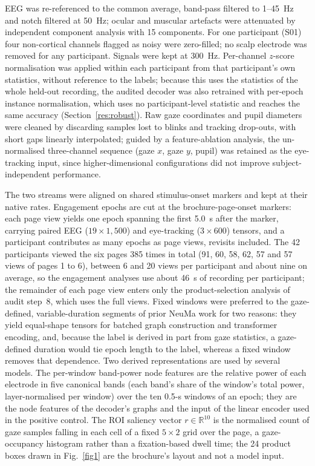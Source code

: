 \documentclass[pdflatex,sn-basic,Numbered,twocolumn,iicol]{sn-jnl}
\theoremstyle{thmstyleone}%
\theoremstyle{thmstyletwo}%
\theoremstyle{thmstylethree}%
\begin{document}
EEG was re-referenced to the common average, band-pass filtered to 1--45~Hz and notch filtered at 50~Hz; ocular and muscular artefacts were attenuated by independent component analysis with 15 components. For one participant (S01) four non-cortical channels flagged as noisy were zero-filled; no scalp electrode was removed for any participant. Signals were kept at 300~Hz. Per-channel $z$-score normalisation was applied within each participant from that participant's own statistics, without reference to the labels; because this uses the statistics of the whole held-out recording, the audited decoder was also retrained with per-epoch instance normalisation, which uses no participant-level statistic and reaches the same accuracy (Section~\ref{res:robust}). Raw gaze coordinates and pupil diameters were cleaned by discarding samples lost to blinks and tracking drop-outs, with short gaps linearly interpolated; guided by a feature-ablation analysis, the un-normalised three-channel sequence (gaze $x$, gaze $y$, pupil) was retained as the eye-tracking input, since higher-dimensional configurations did not improve subject-independent performance.

The two streams were aligned on shared stimulus-onset markers and kept at their native rates. Engagement epochs are cut at the brochure-page-onset markers: each page view yields one epoch spanning the first 5.0~s after the marker, carrying paired EEG ($19\times1{,}500$) and eye-tracking ($3\times600$) tensors, and a participant contributes as many epochs as page views, revisits included. The 42 participants viewed the six pages 385 times in total (91, 60, 58, 62, 57 and 57 views of pages 1 to 6), between 6 and 20 views per participant and about nine on average, so the engagement analyses use about 46~s of recording per participant; the remainder of each page view enters only the product-selection analysis of audit step~8, which uses the full views. Fixed windows were preferred to the gaze-defined, variable-duration segments of prior NeuMa work \cite{ref18} for two reasons: they yield equal-shape tensors for batched graph construction and transformer encoding, and, because the label is derived in part from gaze statistics, a gaze-defined duration would tie epoch length to the label, whereas a fixed window removes that dependence. Two derived representations are used by several models. The per-window band-power node features are the relative power of each electrode in five canonical bands (each band's share of the window's total power, layer-normalised per window) over the ten 0.5-s windows of an epoch; they are the node features of the decoder's graphs and the input of the linear encoder used in the positive control. The ROI saliency vector $r\in\mathbb{R}^{10}$ is the normalised count of gaze samples falling in each cell of a fixed $5\times2$ grid over the page, a gaze-occupancy histogram rather than a fixation-based dwell time; the 24 product boxes drawn in Fig.~\ref{fig1} are the brochure's layout and not a model input.
\end{document}
